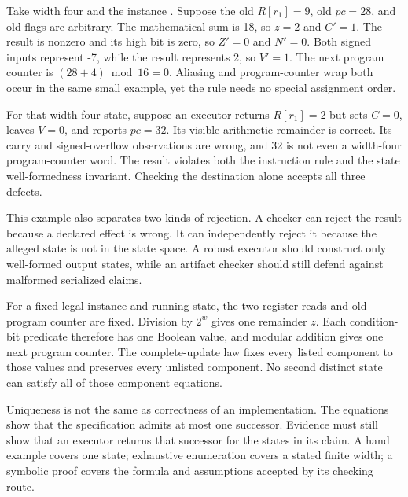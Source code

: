 Take width four and the instance . Suppose the old
\(R[r_1]=9\), old \(pc=28\), and old flags are arbitrary. The mathematical
sum is 18, so \(z=2\) and \(C'=1\). The result is nonzero and its high bit is
zero, so \(Z'=0\) and \(N'=0\). Both signed inputs represent -7, while the
result represents 2, so \(V'=1\). The next program counter is
\((28+4)\bmod16=0\). Aliasing and program-counter wrap both occur in the same
small example, yet the rule needs no special assignment order.

\begin{example}[title={A plausible result with three hidden errors}]
For that width-four state, suppose an executor returns \(R[r_1]=2\) but sets
\(C=0\), leaves \(V=0\), and reports \(pc=32\). Its visible arithmetic
remainder is correct. Its carry and signed-overflow observations are wrong,
and 32 is not even a width-four program-counter word. The result violates both
the instruction rule and the state well-formedness invariant. Checking the
destination alone accepts all three defects.
\end{example}

This example also separates two kinds of rejection. A checker can reject the
result because a declared effect is wrong. It can independently reject it
because the alleged state is not in the state space. A robust executor should
construct only well-formed output states, while an artifact checker should
still defend against malformed serialized claims.

\begin{proofkit}[title={The A0 addition successor is unique}]
For a fixed legal instance and running state, the two register reads and old
program counter are fixed. Division by \(2^w\) gives one remainder \(z\).
Each condition-bit predicate therefore has one Boolean value, and modular
addition gives one next program counter. The complete-update law fixes every
listed component to those values and preserves every unlisted component.
No second distinct state can satisfy all of those component equations.
\end{proofkit}

Uniqueness is not the same as correctness of an implementation. The equations
show that the specification admits at most one successor. Evidence must still
show that an executor returns that successor for the states in its claim. A
hand example covers one state; exhaustive enumeration covers a stated finite
width; a symbolic proof covers the formula and assumptions accepted by its
checking route.

